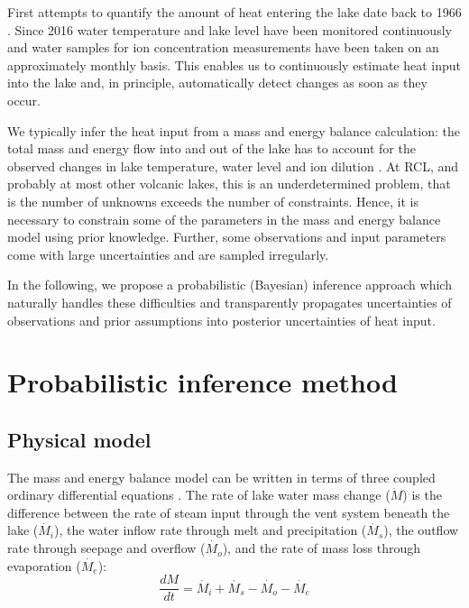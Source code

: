 \documentclass[doublespacing]{bmcart}
\begin{document}
First attempts to quantify the amount of heat entering the lake date back to
1966 \citep{Dibble1966}. Since 2016 water temperature and lake level have been
monitored continuously and water samples for ion concentration measurements have
been taken on an approximately monthly basis. This enables us to continuously
estimate heat input into the lake and, in principle, automatically detect
changes as soon as they occur.

We typically infer the heat input from a mass and energy balance calculation:
the total mass and energy flow into and out of the lake has to account for the
observed changes in lake temperature, water level and ion dilution
\cite{Hurst1981, Hurst1991, Stevenson1992, Fournier2009, Scott1994}. At RCL, and
probably at most other volcanic lakes, this is an underdetermined problem, that
is the number of unknowns exceeds the number of constraints. Hence, it is
necessary to constrain some of the parameters in the mass and energy balance
model using prior knowledge. Further, some observations and input parameters
come with large uncertainties and are sampled irregularly.

In the following, we propose a probabilistic (Bayesian) inference approach which
naturally handles these difficulties and transparently propagates uncertainties of
observations and prior assumptions into posterior uncertainties of heat input.

\section{Probabilistic inference method}\label{Pim}

\subsection{Physical model}\label{phm}

The mass and energy balance model can be written in terms of three coupled
ordinary differential equations \cite{Hurst1991, Stevenson1992}. The rate of
lake water mass change ($\dot{M}$) is the difference between the rate of steam
input through the vent system beneath the lake ($\dot{M_i}$), the water inflow
rate through melt and precipitation ($\dot{M_s}$), the outflow rate through
seepage and overflow ($\dot{M_o}$), and the rate of mass loss through
evaporation ($\dot{M_e}$): 
\begin{equation}\label{ode_M}
	\frac{dM}{dt} = \dot{M_i} + \dot{M_s} - \dot{M_o} - \dot{M_e} 
\end{equation}
\end{document}
